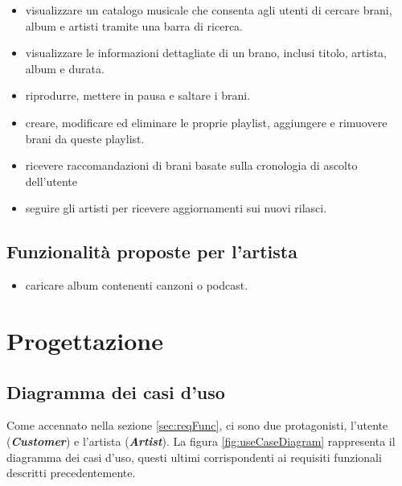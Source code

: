\documentclass{article}
\begin{document}
  \begin{itemize}

    \item visualizzare un catalogo musicale che consenta agli utenti di cercare brani, album e artisti tramite una barra
    di ricerca.

    \item visualizzare le informazioni dettagliate di un brano, inclusi titolo, artista, album e durata.

    \item riprodurre, mettere in pausa e saltare i brani.

    \item creare, modificare ed eliminare le proprie playlist, aggiungere e rimuovere brani da queste playlist.

    \item ricevere raccomandazioni di brani basate sulla cronologia di ascolto dell'utente

    \item seguire gli artisti per ricevere aggiornamenti sui nuovi rilasci.

  \end{itemize}

  \subsection{Funzionalità proposte per l'artista}

  \begin{itemize}

    \item caricare album contenenti canzoni o podcast.

  \end{itemize}


  \section{Progettazione}

  \subsection{Diagramma dei casi d'uso}

  Come accennato nella sezione \ref{sec:reqFunc}, ci sono due protagonisti, l'utente (\textbf{\textit{Customer}}) e l'artista (\textbf{\textit{Artist}}). La figura \ref{fig:useCaseDiagram} rappresenta il diagramma dei casi d'uso, questi ultimi corrispondenti ai requisiti funzionali descritti precedentemente.
\end{document}

